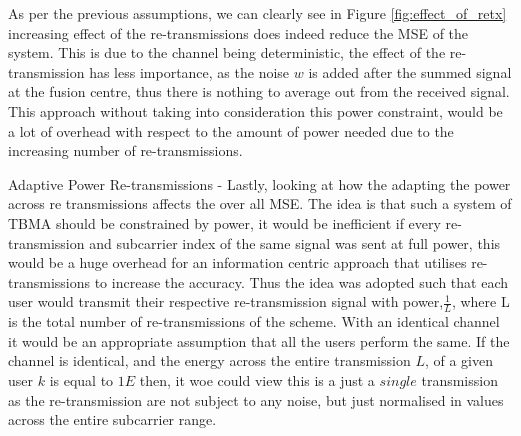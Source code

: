 \documentclass{article}
\begin{document}
As per the previous assumptions, we can clearly see in Figure \ref{fig:effect_of_retx} increasing effect of the re-transmissions does indeed reduce the MSE of the system. This is due to the channel being deterministic, the effect of the re-transmission has less importance, as the noise $w$ is added after the summed signal at the fusion centre, thus there is nothing to average out from the received signal. This approach without taking into consideration this power constraint, would be a lot of overhead with respect to the amount of power needed due to the increasing number of re-transmissions.

Adaptive Power Re-transmissions - Lastly, looking at how the adapting the power across re transmissions affects the over all MSE. The idea is that such a system of TBMA should be constrained by power, it would be inefficient if every re-transmission and subcarrier index of the same signal was sent at full power, this would be a huge overhead for an information centric approach that utilises re-transmissions to increase the accuracy. Thus the idea was adopted such that each user would transmit their respective  re-transmission signal with power,$\frac{1}{L}$, where L is the total number of re-transmissions of the scheme. With an identical channel it would be an appropriate assumption that all the users perform the same. 
If the channel is identical, and the energy across the entire transmission $L$, of a given user $k$ is equal to $1E$ then, it woe could view this is a just a $single$ transmission as the re-transmission are not subject to any noise, but just normalised in values across the entire subcarrier range. 
\end{document}
